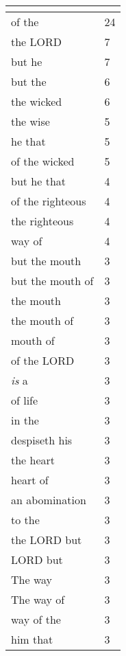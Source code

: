 \begin{center}
\begin{longtable}{|p{3.0in}|p{0.5in}|}
\hline \multicolumn{2}{c}{{ }} \\ \hline
\endfoot 
of the & 24\\ \hline 
the LORD & 7\\ \hline 
but he & 7\\ \hline 
but the & 6\\ \hline 
the wicked & 6\\ \hline 
the wise & 5\\ \hline 
he that & 5\\ \hline 
of the wicked & 5\\ \hline 
but he that & 4\\ \hline 
of the righteous & 4\\ \hline 
the righteous & 4\\ \hline 
way of & 4\\ \hline 
but the mouth & 3\\ \hline 
but the mouth of & 3\\ \hline 
the mouth & 3\\ \hline 
the mouth of & 3\\ \hline 
mouth of & 3\\ \hline 
of the LORD & 3\\ \hline 
\emph{is} a & 3\\ \hline 
of life & 3\\ \hline 
in the & 3\\ \hline 
despiseth his & 3\\ \hline 
the heart & 3\\ \hline 
heart of & 3\\ \hline 
an abomination & 3\\ \hline 
to the & 3\\ \hline 
the LORD but & 3\\ \hline 
LORD but & 3\\ \hline 
The way & 3\\ \hline 
The way of & 3\\ \hline 
way of the & 3\\ \hline 
him that & 3\\ \hline 
\end{longtable}
\end{center}





